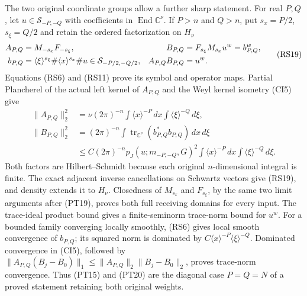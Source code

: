 \documentclass[
  11pt,
]{article}
\begin{document}
The two original coordinate groups allow a further sharp statement. For
real \(P,Q\), let \(u\in\mathcal S_{-P,-Q}\) with coefficients in
\(\operatorname{End}\mathbb C^\nu\). If \(P>n\) and \(Q>n\), put
\(s_x=P/2\), \(s_\xi=Q/2\) and retain the ordered factorization on
\(H_\nu\) {\small\let\split\aligned\let\endsplit\endaligned
\[
 \begin{split}
 A_{P,Q}&=M_{-s_x}F_{-s_\xi},&
 B_{P,Q}&=F_{s_\xi}M_{s_x}u^w=b_{P,Q}^w,\\
 b_{P,Q}&=\langle\xi\rangle^{s_\xi}
                 \#\langle x\rangle^{s_x}\#u
        \in\mathcal S_{-P/2,-Q/2},&
 A_{P,Q}B_{P,Q}&=u^w .
 \end{split}
 \tag{RS19}
\]
} Equations (RS6) and (RS11) prove its symbol and operator maps.
Partial Plancherel of the actual left kernel of \(A_{P,Q}\) and the Weyl
kernel isometry (CI5) give \[
 \begin{split}
 \|A_{P,Q}\|_2^2
   &=\nu(2\pi)^{-n}
          \int\langle x\rangle^{-P}\,dx
          \int\langle\xi\rangle^{-Q}\,d\xi,\\
 \|B_{P,Q}\|_2^2
   &=(2\pi)^{-n}\int
             \operatorname{tr}_{\mathbb C^\nu}(b_{P,Q}^*b_{P,Q})\,dx\,d\xi\\
   &\leq C(2\pi)^{-n}p_J(u;m_{-P,-Q},G)^2
          \int\langle x\rangle^{-P}\,dx
          \int\langle\xi\rangle^{-Q}\,d\xi .
 \end{split}
 \tag{RS20}
\] Both factors are Hilbert--Schmidt because each original
\(n\)-dimensional integral is finite. The exact adjacent inverse
cancellations on Schwartz vectors give (RS19), and density extends it to
\(H_\nu\). Closedness of \(M_{s_x}\) and \(F_{s_\xi}\), by the same two
limit arguments after (PT19), proves both full receiving domains for
every input. The trace-ideal product bound gives a finite-seminorm
trace-norm bound for \(u^w\). For a bounded family converging locally
smoothly, (RS6) gives local smooth convergence of \(b_{P,Q}\); its
squared norm is dominated by
\(C\langle x\rangle^{-P}\langle\xi\rangle^{-Q}\). Dominated convergence
in (CI5), followed by
\(\|A_{P,Q}(B_j-B_0)\|_1\leq\|A_{P,Q}\|_2\|B_j-B_0\|_2\), proves
trace-norm convergence. Thus (PT15) and (PT20) are the diagonal case
\(P=Q=N\) of a proved statement retaining both original weights.
\end{document}
